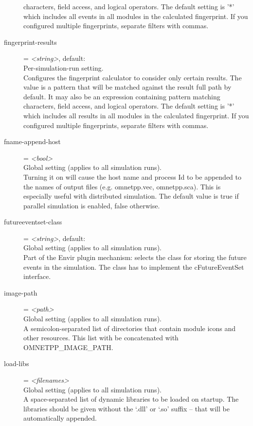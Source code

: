 \begin{description}
    characters, field access, and logical operators. The default setting is '*'
    which includes all events in all modules in the calculated fingerprint. If
    you configured multiple fingerprints, separate filters with commas.
\item[fingerprint-results] = \textit{<string>}, default: \ttt{*}\\
    Per-simulation-run setting.\\
    Configures the fingerprint calculator to consider only certain results. The
    value is a pattern that will be matched against the result full path by
    default. It may also be an expression containing pattern matching
    characters, field access, and logical operators. The default setting is '*'
    which includes all results in all modules in the calculated fingerprint. If
    you configured multiple fingerprints, separate filters with commas.
\item[fname-append-host] = \textit{<bool>}\\
    Global setting (applies to all simulation runs).\\
    Turning it on will cause the host name and process Id to be appended to the
    names of output files (e.g. omnetpp.vec, omnetpp.sca). This is especially
    useful with distributed simulation. The default value is true if parallel
    simulation is enabled, false otherwise.
\item[futureeventset-class] = \textit{<string>}, default: \\
    Global setting (applies to all simulation runs).\\
    Part of the Envir plugin mechanism: selects the class for storing the
    future events in the simulation. The class has to implement the
    cFutureEventSet interface.
\item[image-path] = \textit{<path>}\\
    Global setting (applies to all simulation runs).\\
    A semicolon-separated list of directories that contain module icons and
    other resources. This list with be concatenated with OMNETPP\_IMAGE\_PATH.
\item[load-libs] = \textit{<filenames>}\\
    Global setting (applies to all simulation runs).\\
    A space-separated list of dynamic libraries to be loaded on startup. The
    libraries should be given without the `.dll' or `.so' suffix -- that will
    be automatically appended.

\end{description}
